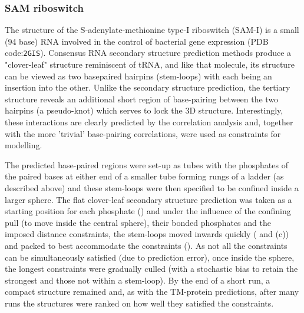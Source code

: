 \documentclass[review]{elsarticle}
\begin{document}
{{{{{\subsubsection{SAM riboswitch}

The structure of the S-adenylate-methionine type-I riboswitch (SAM-I) is a small (94 base) RNA involved
in the control of bacterial gene expression (PDB code:{\tt 2GIS}).   Consensus RNA secondary structure
prediction methods \cite{HofackerIL03} produce a "clover-leaf" structure reminiscent of tRNA, and like that molecule, its
structure can be viewed as two basepaired hairpins (stem-loops) with each being an insertion into the
other.  Unlike the secondary structure prediction, the tertiary structure reveals an additional
short region of base-pairing between the two hairpins (a pseudo-knot) which serves
to lock the 3D structure.   Interestingly, these interactions are clearly predicted
by the correlation analysis and, together with the more 'trivial' base-pairing
correlations, were used as constraints for modelling.

The predicted base-paired regions were set-up as tubes with the phosphates of the paired bases
at either end of a smaller tube forming rungs of a ladder (as described above) and these stem-loops
were then specified to be confined inside a larger sphere.    The flat clover-leaf secondary structure
prediction was taken as a starting position for each phosphate () and under the
influence of the confining pull (to move inside the central sphere), their bonded phosphates
and the imposed distance constraints, the stem-loops moved inwards quickly ( and (c))
and packed to best accommodate the constraints ().    As not all the constraints can be
simultaneously satisfied (due to prediction error), once inside the sphere,
the longest constraints were gradually culled (with a stochastic bias to retain the
strongest and those not within a stem-loop).   By the end of a short run, a compact
structure remained and, as with the TM-protein predictions, after many runs the structures
were ranked on how well they satisfied the constraints.

}}}}}
\end{document}

